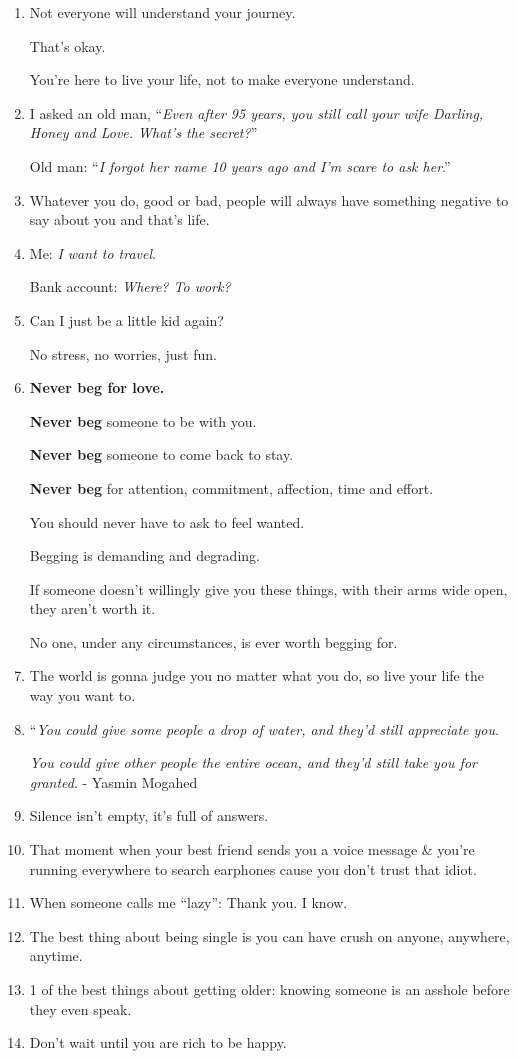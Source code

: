 \documentclass{article}
\numberwithin{equation}{section}
\begin{document}
\begin{enumerate}
    Whatever was behind it was not meant for you.
    
    Consider that perhaps the door was closed because you're worth so much more than what was on the other side.
    \item Not everyone will understand your journey.
    
    That's okay.
    
    You're here to live your life, not to make everyone understand.
    \item I asked an old man, ``\textit{Even after 95 years, you still call your wife Darling, Honey and Love. What's the secret?}''
    
    Old man: ``\textit{I forgot her name 10 years ago and I'm scare to ask her}.''
    \item Whatever you do, good or bad, people will always have something negative to say about you and that's life.
    \item Me: \textit{I want to travel}.
    
    Bank account: \textit{Where? To work?}
    \item Can I just be a little kid again?
    
    No stress, no worries, just fun.
    \item \textbf{Never beg for love.}
    
    \textbf{Never beg} someone to be with you.
    
    \textbf{Never beg} someone to come back to stay.
    
    \textbf{Never beg} for attention, commitment, affection, time and effort.
    
    You should never have to ask to feel wanted.
    
    Begging is demanding and degrading.
    
    If someone doesn't willingly give you these things, with their arms wide open, they aren't worth it.
    
    No one, under any circumstances, is ever worth begging for.
    \item The world is gonna judge you no matter what you do, so live your life the way you want to.
    \item ``\textit{You could give some people a drop of water, and they'd still appreciate you}.
    
    \textit{You could give other people the entire ocean, and they'd still take you for granted}. - Yasmin Mogahed
    \item Silence isn't empty, it's full of answers.
    \item That moment when your best friend sends you a voice message \& you're running everywhere to search earphones cause you don't trust that idiot.
    \item When someone calls me ``lazy'': Thank you. I know.
    \item The best thing about being single is you can have crush on anyone, anywhere, anytime.
    \item 1 of the best things about getting older: knowing someone is an asshole before they even speak.
    \item Don't wait until you are rich to be happy.
    

\end{enumerate}
\end{document}
